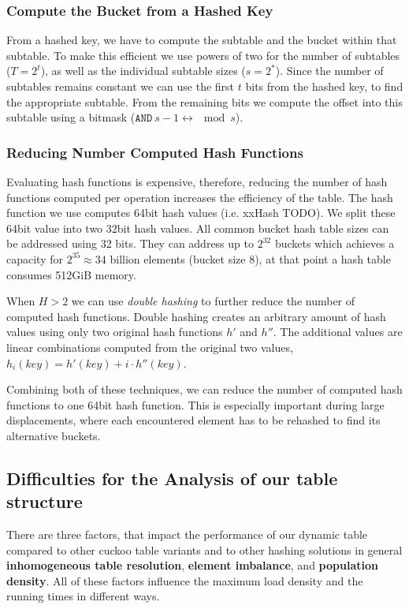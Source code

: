 \documentclass[a4paper,UKenglish]{lipics-v2016}
\begin{document}
\subsubsection*{Compute the Bucket from a Hashed Key}
From a hashed key, we have to compute the subtable and the bucket
within that subtable.  To make this efficient we use powers of two for
the number of subtables ($T = 2^t$), as well as the individual
subtable sizes ($s = 2^*$).  Since the number of subtables remains
constant we can use the first $t$ bits from the hashed key, to find the
appropriate subtable.  From the remaining bits we compute the offset
into this subtable using a bitmask ($\texttt{AND}~s-1 \leftrightarrow
\mod s$).

\subsubsection*{Reducing Number Computed Hash Functions}
Evaluating hash functions is expensive, therefore, reducing the number
of hash functions computed per operation increases the efficiency of
the table.  The hash function we use computes 64bit hash values
(i.e. xxHash TODO).  We split these 64bit value into two 32bit hash
values. All common bucket hash table sizes can be addressed using 32
bits. They can address up to $2^{32}$ buckets which achieves a
capacity for $2^{35} \approx 34$ billion elements (bucket size 8),
at that point a hash table consumes 512GiB memory.

When $H > 2$ we can use \emph{double hashing} to further reduce the number
of computed hash functions. Double hashing creates an arbitrary amount
of hash values using only two original hash functions $h'$ and
$h''$.  The additional values are linear combinations computed
from the original two values, $h_i(key) = h'(key) + i\cdot
h''(key)$.

Combining both of these techniques, we can reduce the number of
computed hash functions to one 64bit hash function.  This is
especially important during large displacements, where each
encountered element has to be rehashed to find its alternative
buckets.

\subsection{Difficulties for the Analysis of our table structure}
There are three factors, that impact the performance of our dynamic
table compared to other cuckoo table variants and to other hashing solutions in
general \textbf{inhomogeneous table resolution}, \textbf{element imbalance}, and
\textbf{population density}. All of these factors influence the maximum load
density and the running times in different ways.
\end{document}
